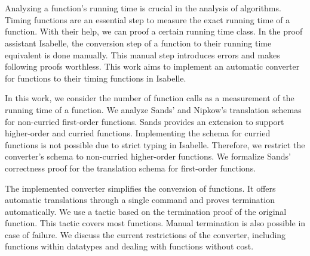 \chapter{\abstractname}

Analyzing a function's running time is crucial in the analysis of algorithms.
Timing functions are an essential step to measure the exact running time of a function.
With their help, we can proof a certain running time class.
In the proof assistant Isabelle, the conversion step of a function to their running time equivalent is done manually.
This manual step introduces errors and makes following proofs worthless.
This work aims to implement an automatic converter for functions to their timing functions in Isabelle.

In this work, we consider the number of function calls as a measurement of the running time of a function.
We analyze Sands' and Nipkow's translation schemas for non-curried first-order functions.
Sands provides an extension to support higher-order and curried functions.
Implementing the schema for curried functions is not possible due to strict typing in Isabelle.
Therefore, we restrict the converter's schema to non-curried higher-order functions.
We formalize Sands' correctness proof for the translation schema for first-order functions.

The implemented converter simplifies the conversion of functions.
It offers automatic translations through a single command and proves termination automatically.
We use a tactic based on the termination proof of the original function.
This tactic covers most functions.
Manual termination is also possible in case of failure.
We discuss the current restrictions of the converter, including functions within datatypes and dealing with functions without cost.
